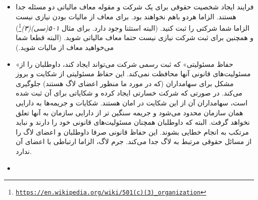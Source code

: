 \begin{itemize}
\item
فرایند ایجاد شخصیت حقوقی برای یک شرکت و مقوله معاف مالیاتی
دو مسئله جدا هستند. الزاما هردو باهم نخواهند بود. برای معاف از مالیات
بودن نیازی نیست الزاما شما شرکتی را ثبت کنید. (البته استثنا وجود دارد.
برای مثال
\emph{۵۰۱(سی)(۳)}\footnote{\texttt{\url{https://en.wikipedia.org/wiki/501(c)(3)_organization}}})
و همچنین برای ثبت شرکت نیازی نیست حتما معاف مالیاتی شوید.
(البته قطعا شما می‌خواهید معاف از مالیات شوید.)

\item
«حفاظ مسئولیتی» که ثبت رسمی شرکت می‌تواند ایجاد کند، داوطلبان را از
مسئولیت‌های قانونی آنها محافظت نمی‌کند. این حفاظ مسئولیتی از شکایت و
بروز مشکل برای سهامداران (که در مورد ما منظور اعضای لاگ هستند) جلوگیری
می‌کند. در صورتی که شرکت خسارتی ایجاد کرده و شکایاتی برای آن ثبت شده است،
سهامداران آن از این شکایت در امان هستند. شکایات و جریمه‌ها به دارایی همان
سازمان محدود می‌شود و جریمه سنگین تر از دارایی سازمان به آنها تعلق نخواهد گرفت.
البته که داوطلبان همچنان مسئولیت‌های قانونی خود را دارند و نباید مرتکب به
انجام خطایی بشوند. این حفاظ قانونی صرفا داوطلبان و اعضای لاگ را از مسائل
حقوقی مرتبط به لاگ جدا می‌کند. جرم لاگ، الزاما ارتباطی با اعضای آن ندارد.

\item


\end{itemize}

